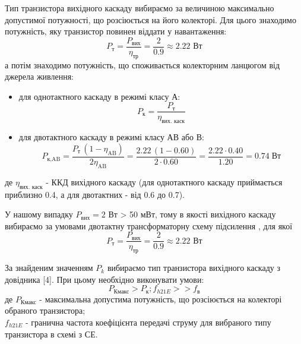 \documentclass[main.tex]{subfiles}
\begin{document}
\begin{enumerate}
Тип транзистора вихідного каскаду вибираємо за величиною максимально
допустимої потужності, що розсіюється на його колекторі. Для цього знаходимо
потужність, яку транзистор повинен віддати у навантаження:
\[
P_\text{т} = \frac{P_\text{вих}}{\eta_\text{тр}} = \frac{2}{0.9} \approx 2.22 \text{ Вт}
\]
а потім знаходимо потужність, що споживається колекторним ланцюгом від джерела живлення:

\begin{itemize}
    \item для однотактного каскаду в режимі класу А:
\[
P_\text{к} = \frac{P_\text{т}}{\eta_\text{вих. каск}}
\]
    \item для двотактного каскаду в режимі класу АВ або В:
\[
P_{\text{к,AB}}
      =\frac{P_{\text{т}}\,(1-\eta_{\text{AB}})}{2\eta_{\text{AB}}}
      =\frac{2.22\,(1-0.60)}{2\cdot0.60}
      =\frac{2.22 \cdot 0.40}{1.20}
      =0.74\;\text{Вт}
\]
\end{itemize}
де $\eta_\text{вих. каск}$ - ККД вихідного каскаду (для однотактного каскаду приймається приблизно 0.4, а для двотактних - від 0.6 до 0.7).

У нашому випадку $P_\text{вих} = 2$ Вт > 50 мВт, тому в якості вихідного каскаду
вибираємо за умовами двотактну трансформаторну схему підсилення \cite{kolontaevsky_electronics}, для якої
\[
P_\text{т} = \frac{P_\text{вих}}{\eta_\text{тр}} = \frac{2}{0.9} \approx 2.22 \text{ Вт}
\]

За знайденим значенням $P_{k}$ вибираємо тип транзистора вихідного каскаду з довідника [4]. При цьому необхідно виконувати умови:
\[
P_\text{Кмакс} > P_\text{к}; f_{h21E} >> f_\text{в}
\]
де $P_\text{Кмакс}$ - максимальна допустима потужність, що розсіюється на колекторі обраного транзистора;\\
$f_{h21E}$ - гранична частота коефіцієнта передачі струму для вибраного типу транзистора в схемі з СЕ.


\end{enumerate}
\end{document}
